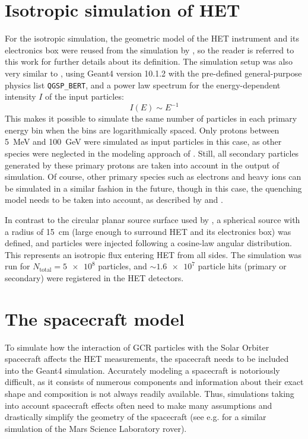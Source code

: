 \section{Isotropic simulation of HET}
\label{sec:isotropic_sim}

For the isotropic simulation, the geometric model of the HET instrument and its electronics box were reused from the simulation by \citet{Elftmann-2020-PhD}, so the reader is referred to this work for further details about its definition. The simulation setup was also very similar to \citet{Elftmann-2020-PhD}, using Geant4 version 10.1.2 with the pre-defined general-purpose physics list \texttt{QGSP\_BERT}, and a power law spectrum for the energy-dependent intensity $I$ of the input particles:
\begin{equation}
I(E) \sim E^{-1}
\label{eq:het_g4_spectrum}
\end{equation}
This makes it possible to simulate the same number of particles in each primary energy bin when the bins are logarithmically spaced. Only protons between \SI{5}{\mega\electronvolt} and \SI{100}{\giga\electronvolt} were simulated as input particles in this case, as other species were neglected in the modeling approach of \citet{Forstner-2021-SolO}. Still, all secondary particles generated by these primary protons are taken into account in the output of simulation. Of course, other primary species such as electrons and heavy ions can be simulated in a similar fashion in the future, though in this case, the quenching model needs to be taken into account, as described by \citet[Section 5.4]{Elftmann-2020-PhD} and \citet{Tammen-2015}.

In contrast to the circular planar source surface used by \citet{Elftmann-2020-PhD}, a spherical source with a radius of \SI{15}{\centi\meter} (large enough to surround HET and its electronics box) was defined, and particles were injected following a cosine-law angular distribution. This represents an isotropic flux entering HET from all sides.
The simulation was run for $N_\text{total} = \num{5e8}$ particles, and $\sim\num{1.6e7}$ particle hits (primary or secondary) were registered in the HET detectors.

\section{The spacecraft model}
\label{sec:spacecraft_model}

To simulate how the interaction of GCR particles with the Solar Orbiter spacecraft affects the HET measurements, the spacecraft needs to be included into the Geant4 simulation. Accurately modeling a spacecraft is notoriously difficult, as it consists of numerous components and information about their exact shape and composition is not always readily available. Thus, simulations taking into account spacecraft effects often need to make many assumptions and drastically simplify the geometry of the spacecraft (see e.g. \citet{Appel-2018-PhD,Appel-2018} for a similar simulation of the Mars Science Laboratory rover).


